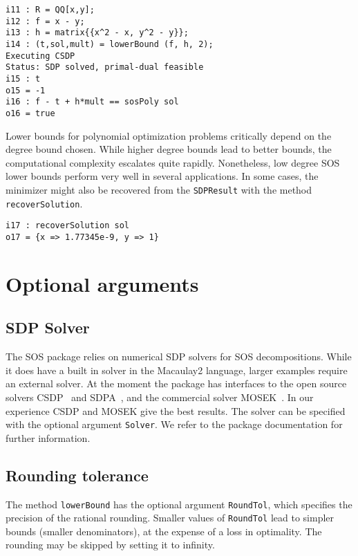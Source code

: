 \documentclass[11pt]{amsart}
\theoremstyle{plain}%
\theoremstyle{definition}
\theoremstyle{remark}
\newcommand{\Mac}{Macaulay2\xspace}
\newcommand{\SOS}{\textsc{SOS}\xspace}
\begin{document}
{\small
\begin{verbatim}
i11 : R = QQ[x,y];
i12 : f = x - y;
i13 : h = matrix{{x^2 - x, y^2 - y}};
i14 : (t,sol,mult) = lowerBound (f, h, 2);
Executing CSDP
Status: SDP solved, primal-dual feasible
i15 : t
o15 = -1
i16 : f - t + h*mult == sosPoly sol
o16 = true
\end{verbatim}
}

Lower bounds for polynomial optimization problems critically depend on the degree bound chosen.
While higher degree bounds lead to better bounds, the computational complexity escalates quite rapidly.
Nonetheless, low degree SOS lower bounds perform very well in several applications.
In some cases, the minimizer might also be recovered from the \verb|SDPResult| with the method \verb|recoverSolution|.

{\small
\begin{verbatim}
i17 : recoverSolution sol
o17 = {x => 1.77345e-9, y => 1}
\end{verbatim}
}

\section{Optional arguments}
\label{s:arguments}

\subsection*{SDP Solver}
The \SOS package relies on numerical SDP solvers for SOS decompositions.  
While it does have a built in solver in the \Mac language, larger examples require an external solver.
At the moment the package has interfaces to the open source solvers CSDP~\cite{borchers1999csdp} and SDPA~\cite{yamashita2003implementation}, and the commercial solver MOSEK~\cite{mosek}.
In our experience CSDP and MOSEK give the best results.
The solver can be specified with the optional argument \verb|Solver|.
We refer to the package documentation for further information.

\subsection*{Rounding tolerance}
The method \verb|lowerBound| has the optional argument \verb|RoundTol|, which specifies the precision of the rational rounding.
Smaller values of \verb|RoundTol| lead to simpler bounds (smaller denominators), at the expense of a loss in optimality.
The rounding may be skipped by setting it to infinity.
\end{document}
